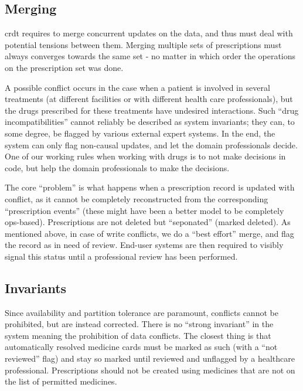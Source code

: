 \documentclass[english]{article}
\begin{document}
\subsection{Merging}

\gls{crdt} requires to merge concurrent updates on the data, and thus must deal with potential tensions between them. Merging multiple sets of
prescriptions must always converges towards the same set - no matter in which order the operations on the prescription set was done.

A possible conflict occurs in the case when a patient is involved in several treatments (at different facilities or with different health care professionals), but the drugs prescribed for these treatments have undesired interactions. Such ``drug incompatibilities'' cannot reliably be described as system invariants; they can, to some degree, be flagged by various external expert systems. In the end, the system can only flag non-causal updates, and let the domain professionals decide. One of our working rules when working with drugs is to not make decisions in code, but help the domain professionals to make the decisions.

The core ``problem'' is what happens when a prescription record is updated with conflict, as it cannot be completely reconstructed from the corresponding ``prescription events'' (these might have been a better model to be completely ops-based). Prescriptions are not deleted but ``seponated'' (marked deleted). As mentioned above, in case of write conflicts, we do a ``best effort'' merge, and flag the record as in need of review. End-user systems are then required to visibly signal this status until a professional review has been performed.



\subsection{Invariants}

Since availability and partition tolerance are paramount, conflicts cannot be prohibited, but are instead corrected. There is no ``strong invariant'' in the system meaning the prohibition of data conflicts. The closest thing is that automatically resolved medicine cards must be marked as such (with a ``not reviewed'' flag) and stay so marked until reviewed and unflagged by a healthcare professional. Prescriptions should not be created using medicines that are not on the list of permitted medicines.
\end{document}
